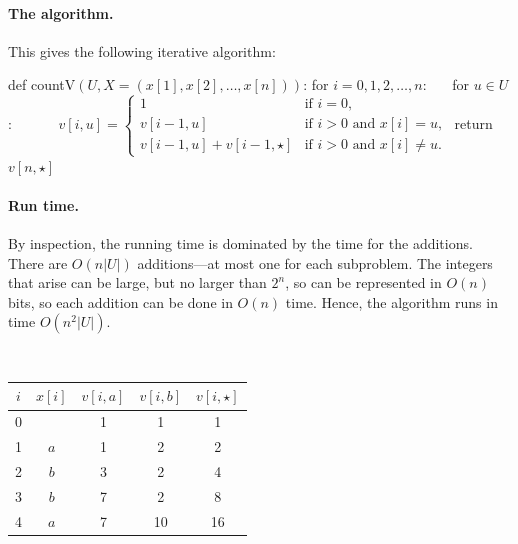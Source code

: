 \documentclass[11pt]{article}
\begin{document}
\continued

\paragraph{The algorithm.}
This gives the following iterative algorithm:

\newcommand{\countV}{\textsf{countV}}

\smallskip 

\begin{myframed}
  \begin{steps}
  \item[]
    def \countV$(U, X=(x[1], x[2], \ldots, x[n]))$:
    \step for $i=0,1,2,\ldots, n$:
    \step~~~for $u\in U$:
      \step~~~~~~\(
      v[i, u] =
      \begin{cases}
        1 & \text{if } i=0, \\
        v[i-1, u] & \text{if } i > 0 \text{ and } x[i] = u, \\
        v[i-1, u] + v[i-1, \star]& \text{if } i > 0 \text{ and } x[i] \ne u.
      \end{cases}
      \)
    \step return $v[n, \star]$
  \end{steps}
\end{myframed}

\vspace*{-10pt}
\paragraph{Run time.}
By inspection, the running time is dominated by the time for the additions.
There are $O(n|U|)$ additions---at most one for each subproblem.
The integers that arise can be large, but no larger than $2^n$, so can be represented in $O(n)$ bits,
so each addition can be done in $O(n)$ time.
Hence, the algorithm runs in time $O(n^2|U|)$.



\noindent
{}~~~{}
\begin{tabular}[t]{c|c@{~}c@{~}c@{~}c@{~}}
  $i$ & $x[i]$ & $v[i,a]$ & $v[i,b]$ & $v[i, \star]$ \\ \hline
  0    &          & 1 & 1 & 1  \\
  1    &  $a$  & 1 & 2 & 2 \\
  2    &  $b$  & 3 & 2 & 4 \\
  3    &  $b$  & 7 & 2 & 8 \\
  4    &  $a$  & 7 & 10 & 16
\end{tabular}
\end{document}
